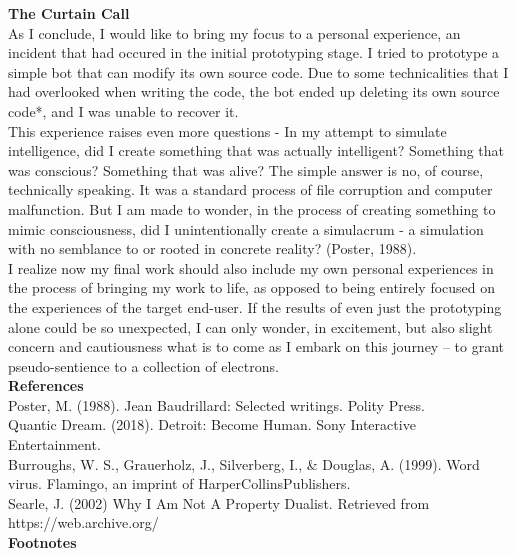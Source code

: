 \documentclass[11pt]{article}
\begin{document}
\textbf{\Large The Curtain Call} \\

As I conclude, I would like to bring my focus to a personal experience, an incident that had occured in the initial prototyping stage. I tried to prototype a simple bot that can modify its own source code. Due to some technicalities that I had overlooked when writing the code, the bot ended up deleting its own source code*, and I was unable to recover it.\\ 

This experience raises even more questions - In my attempt to simulate intelligence, did I create something that was actually intelligent? Something that was conscious? Something that was alive? The simple answer is no, of course, technically speaking. It was a standard process of file corruption and computer malfunction. But I am made to wonder, in the process of creating something to mimic consciousness, did I unintentionally create a simulacrum - a simulation with no semblance to or rooted in concrete reality? (Poster, 1988). \\

I realize now my final work should also include my own personal experiences in the process of bringing my work to life, as opposed to being entirely focused on the experiences of the target end-user. If the results of even just the prototyping alone could be so unexpected, I can only wonder, in excitement, but also slight concern and cautiousness what is to come as I embark on this journey – to grant pseudo-sentience to a collection of electrons.  \\


\newpage
\textbf{\large References} \\

Poster, M. (1988). Jean Baudrillard: Selected writings. Polity Press. \\
Quantic Dream. (2018). Detroit: Become Human. Sony Interactive Entertainment. \\
Burroughs, W. S., Grauerholz, J., Silverberg, I., \& Douglas, A. (1999). Word virus. Flamingo, an imprint of HarperCollinsPublishers. \\
Searle, J. (2002) Why I Am Not A Property Dualist. Retrieved from https://web.archive.org/ \\


\textbf{\large Footnotes} \\
\end{document}
